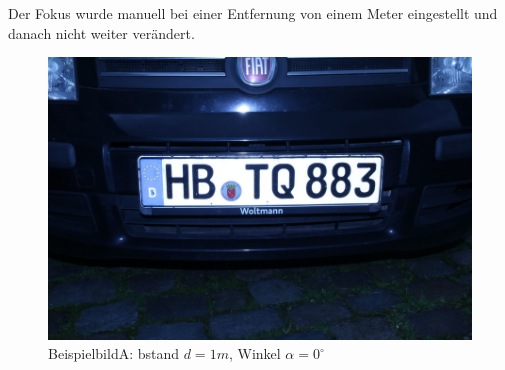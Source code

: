 \documentclass{../Vorlage/sebDenCls}
\begin{document}
Der Fokus wurde manuell bei einer Entfernung von einem Meter eingestellt und danach nicht weiter verändert.

\begin{figure}[htp]
	\centering 	
	\includegraphics[width=.9\textwidth]{beispielbild} 
	\caption{BeispielbildA: bstand $d=1m$, Winkel $\alpha = 0^\circ$ \label{beispiel}}
\end{figure}

\section{}
\end{document}
